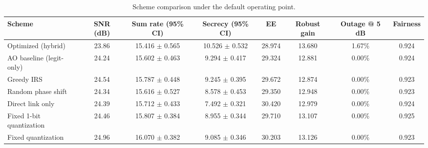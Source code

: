 \begin{table}[t]
\caption{Scheme comparison under the default operating point.}
\label{tab:comparison}
\centering
\begin{tabular}{lccccccc}
\hline
Scheme & SNR (dB) & Sum rate (95\% CI) & Secrecy (95\% CI) & EE & Robust gain & Outage @ 5 dB & Fairness \\
\hline
Optimized (hybrid) & 23.86 & 15.416 $\pm$ 0.565 & 10.526 $\pm$ 0.532 & 28.974 & 13.680 & 1.67\% & 0.924 \\
AO baseline (legit-only) & 24.24 & 15.602 $\pm$ 0.463 & 9.294 $\pm$ 0.417 & 29.324 & 12.881 & 0.00\% & 0.924 \\
Greedy IRS & 24.54 & 15.787 $\pm$ 0.448 & 9.245 $\pm$ 0.395 & 29.672 & 12.874 & 0.00\% & 0.923 \\
Random phase shift & 24.34 & 15.616 $\pm$ 0.527 & 8.578 $\pm$ 0.453 & 29.350 & 12.948 & 0.00\% & 0.923 \\
Direct link only & 24.39 & 15.712 $\pm$ 0.433 & 7.492 $\pm$ 0.321 & 30.420 & 12.979 & 0.00\% & 0.924 \\
Fixed 1-bit quantization & 24.46 & 15.807 $\pm$ 0.384 & 8.955 $\pm$ 0.344 & 29.710 & 13.107 & 0.00\% & 0.925 \\
Fixed quantization & 24.96 & 16.070 $\pm$ 0.382 & 9.085 $\pm$ 0.346 & 30.203 & 13.126 & 0.00\% & 0.923 \\
\hline
\end{tabular}
\end{table}
